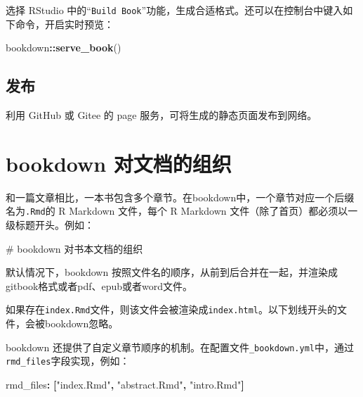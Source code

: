 \documentclass[]{ctexbook}
\newenvironment{Shaded}{\begin{snugshade}}{\end{snugshade}}
\newcommand{\AttributeTok}[1]{\textcolor[rgb]{0.77,0.63,0.00}{#1}}
\newcommand{\FunctionTok}[1]{\textcolor[rgb]{0.00,0.00,0.00}{#1}}
\newcommand{\KeywordTok}[1]{\textcolor[rgb]{0.13,0.29,0.53}{\textbf{#1}}}
\newcommand{\NormalTok}[1]{#1}
\newcommand{\OperatorTok}[1]{\textcolor[rgb]{0.81,0.36,0.00}{\textbf{#1}}}
\newcommand{\StringTok}[1]{\textcolor[rgb]{0.31,0.60,0.02}{#1}}
\begin{document}
选择 RStudio 中的``\texttt{Build\ Book}''功能，生成合适格式。还可以在控制台中键入如下命令，开启实时预览：

\begin{Shaded}
\begin{Highlighting}[]
\NormalTok{bookdown}\OperatorTok{::}\KeywordTok{serve_book}\NormalTok{()}
\end{Highlighting}
\end{Shaded}

\hypertarget{ux53d1ux5e03}{%
\subsection{发布}\label{ux53d1ux5e03}}

利用 GitHub 或 Gitee 的 page 服务，可将生成的静态页面发布到网络。

\hypertarget{bookdown-ux5bf9ux6587ux6863ux7684ux7ec4ux7ec7}{%
\section{bookdown 对文档的组织}\label{bookdown-ux5bf9ux6587ux6863ux7684ux7ec4ux7ec7}}

和一篇文章相比，一本书包含多个章节。在bookdown中，一个章节对应一个后缀名为\texttt{.Rmd}的 R Markdown 文件，每个 R Markdown 文件（除了首页）都必须以一级标题开头。例如：

\begin{Shaded}
\begin{Highlighting}[]
\FunctionTok{# bookdown 对书本文档的组织}
\end{Highlighting}
\end{Shaded}

默认情况下，bookdown 按照文件名的顺序，从前到后合并在一起，并渲染成gitbook格式或者pdf、epub或者word文件。

如果存在\texttt{index.Rmd}文件，则该文件会被渲染成\texttt{index.html}。以下划线开头的文件，会被bookdown忽略。

bookdown 还提供了自定义章节顺序的机制。在配置文件\texttt{\_bookdown.yml}中，通过\texttt{rmd\_files}字段实现，例如：

\begin{Shaded}
\begin{Highlighting}[]
\FunctionTok{rmd_files}\KeywordTok{:}\AttributeTok{ }\KeywordTok{[}\StringTok{"index.Rmd"}\KeywordTok{,}\AttributeTok{ }\StringTok{"abstract.Rmd"}\KeywordTok{,}\AttributeTok{ }\StringTok{"intro.Rmd"}\KeywordTok{]}
\end{Highlighting}
\end{Shaded}
\end{document}
